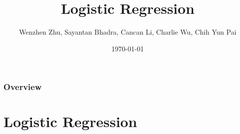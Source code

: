 \documentclass{beamer}
\title[Logistic Regression]{Logistic Regression} %
\author{Wenzhen Zhu, Sayantan Bhadra, Cancan Li, Charlie Wu, Chih Yun Pai} %
\institute[WUSTL] %
{
Washington University in St. Louis \\ %
\medskip
\textit{@wustl.edu} %
}
\date{\today} %
\begin{document}
\begin{frame}
\titlepage %
\end{frame}

\begin{frame}
\frametitle{Overview} %
\tableofcontents %
\end{frame}

\section{Logistic Regression} 
\end{document}
